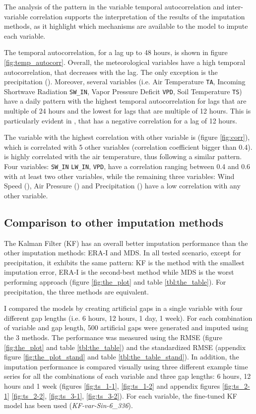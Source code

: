 \documentclass{article}
\let\Oldsubsection\subsection
\renewcommand{\subsection}{\FloatBarrier\Oldsubsection}
\begin{document}
The analysis of the pattern in the variable temporal autocorrelation and inter-variable correlation supports the interpretation of the results of the imputation methods, as it highlight which mechanisms are available to the model to impute each variable.

The temporal autocorrelation, for a lag up to 48 hours, is shown in figure \ref{fig:temp_autocorr}. Overall, the meteorological variables have a high temporal autocorrelation, that decreases with the lag. The only exception is the precipitation (). Moreover, several variables (i.e. Air Temperature \texttt{TA}, Incoming Shortwave Radiation \texttt{SW\_IN},  Vapor Pressure Deficit \texttt{VPD}, Soil Temperature \texttt{TS}) have a daily pattern with the highest temporal autocorrelation for lags that are multiple of 24 hours and the lowest for lags that are multiple of 12 hours. This is particularly evident in , that has a negative correlation for a lag of 12 hours.

The variable with the highest correlation with other variable is  (figure \ref{fig:corr}), which is correlated with 5 other variables (correlation coefficient bigger than 0.4).  is highly correlated with the air temperature, thus following a similar pattern. Four variables: \texttt{SW\_IN} \texttt{LW\_IN}, \texttt{VPD},  have a correlation ranging between 0.4 and 0.6 with at least two other variables, while the remaining three variables: Wind Speed (), Air Pressure () and Precipitation () have a low correlation with any other variable.  


\subsection{Comparison to other imputation methods}

The Kalman Filter (KF) has an overall better imputation performance than the other imputation methods: ERA-I and MDS. In all tested scenario, except for precipitation, it exhibits the same pattern: KF is the method with the smallest imputation error, ERA-I is the second-best method while MDS is the worst performing approach (figure \ref{fig:the_plot} and table \ref{tbl:the_table}). For precipitation, the three methods are equivalent.

I compared the models by creating artificial gaps in a single variable with four different gap lengths (i.e. 6 hours, 12 hours, 1 day, 1 week). For each combination of variable and gap length, 500 artificial gaps were generated and imputed using the 3 methods. The performance was measured using the RMSE (figure \ref{fig:the_plot} and table \ref{tbl:the_table}) and the standardized RMSE (appendix figure \ref{fig:the_plot_stand} and table \ref{tbl:the_table_stand}). In addition, the imputation performance is compared visually using three different example time series for all the combinations of each variable and three gap lengths: 6 hours, 12 hours and 1 week (figures \ref{fig:ts_1-1}, \ref{fig:ts_1-2} and appendix figures \ref{fig:ts_2-1} \ref{fig:ts_2-2}, \ref{fig:ts_3-1}, \ref{fig:ts_3-2}). For each variable, the fine-tuned KF model has been used (\textit{KF-\textlangle var\textrangle-Sin-6\_336}).
\end{document}
